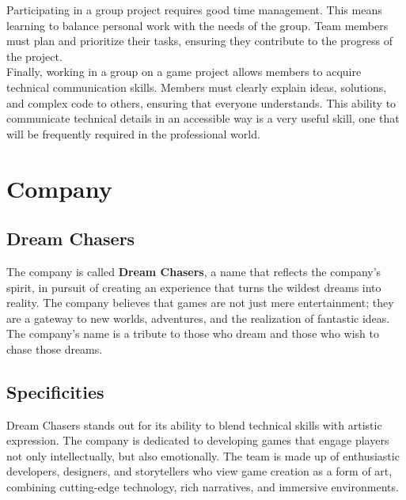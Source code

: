 \documentclass{article}
\begin{document}
Participating in a group project requires good time management. This means learning to balance personal work with the needs of the group. Team members must plan and prioritize their tasks, ensuring they contribute to the progress of the project.\\

Finally, working in a group on a game project allows members to acquire technical communication skills. Members must clearly explain ideas, solutions, and complex code to others, ensuring that everyone understands. This ability to communicate technical details in an accessible way is a very useful skill, one that will be frequently required in the professional world.















\newpage
\section{Company}
\subsection{Dream Chasers}\hfill

The company is called \textbf{Dream Chasers}, a name that reflects the company's spirit, in pursuit of creating an experience that turns the wildest dreams into reality. The company believes that games are not just mere entertainment; they are a gateway to new worlds, adventures, and the realization of fantastic ideas. The company's name is a tribute to those who dream and those who wish to chase those dreams.





\subsection{Specificities}\hfill

Dream Chasers stands out for its ability to blend technical skills with artistic expression. The company is dedicated to developing games that engage players not only intellectually, but also emotionally. The team is made up of enthusiastic developers, designers, and storytellers who view game creation as a form of art, combining cutting-edge technology, rich narratives, and immersive environments.\\
\end{document}
